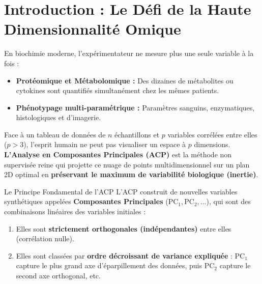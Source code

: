 \documentclass[11pt,a4paper]{article}
\begin{document}

\section{Introduction : Le Défi de la Haute Dimensionnalité Omique}

En biochimie moderne, l'expérimentateur ne mesure plus une seule variable à la fois :
\begin{itemize}[leftmargin=*, label=\faAngleRight]
  \item \textbf{Protéomique et Métabolomique :} Des dizaines de métabolites ou cytokines sont quantifiés simultanément chez les mêmes patients.
  \item \textbf{Phénotypage multi-paramétrique :} Paramètres sanguins, enzymatiques, histologiques et d'imagerie.
\end{itemize}

Face à un tableau de données de $n$ échantillons et $p$ variables corrélées entre elles ($p > 3$), l'esprit humain ne peut pas visualiser un espace à $p$ dimensions. \textbf{L'Analyse en Composantes Principales (ACP)} est la méthode non supervisée reine qui projette ce nuage de points multidimensionnel sur un plan 2D optimal en \textbf{préservant le maximum de variabilité biologique (inertie)}.

\begin{conceptbox}{Le Principe Fondamental de l'ACP}
L'ACP construit de nouvelles variables synthétiques appelées \textbf{Composantes Principales} ($\text{PC}_1, \text{PC}_2, \dots$), qui sont des combinaisons linéaires des variables initiales :
\begin{enumerate}
  \item Elles sont \textbf{strictement orthogonales (indépendantes)} entre elles (corrélation nulle).
  \item Elles sont classées par \textbf{ordre décroissant de variance expliquée} : $\text{PC}_1$ capture le plus grand axe d'éparpillement des données, puis $\text{PC}_2$ capture le second axe orthogonal, etc.
\end{enumerate}
\end{conceptbox}
\end{document}
